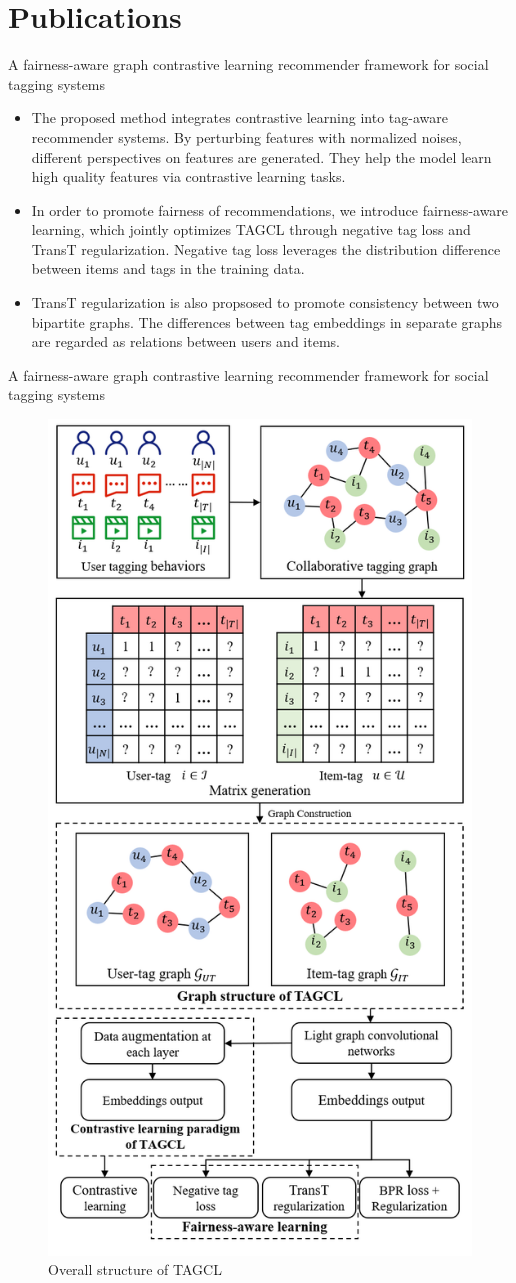 \documentclass{beamer}
\begin{document}
\section{Publications}
\begin{frame}{A fairness-aware graph contrastive learning recommender framework for social tagging systems}
    \begin{itemize}
        \item The proposed method integrates contrastive learning into tag-aware recommender systems. By perturbing features with normalized noises, different perspectives on features are generated. They help the model learn high quality features via contrastive learning tasks.
        \item In order to promote fairness of recommendations, we introduce fairness-aware learning, which jointly optimizes TAGCL through negative tag loss and TransT regularization. Negative tag loss leverages the distribution difference between items and tags in the training data.
        \item TransT regularization is also propsosed to promote consistency between two bipartite graphs. The differences between tag embeddings in separate graphs are regarded as relations between users and items.
    \end{itemize}
\end{frame}

\begin{frame}{A fairness-aware graph contrastive learning recommender framework for social tagging systems}
    \begin{figure}[H]
        \centering
        \includegraphics[width=0.28\linewidth]{figure/tagcl.png}
        \caption{Overall structure of TAGCL}
    \end{figure}
\end{frame}
\end{document}
